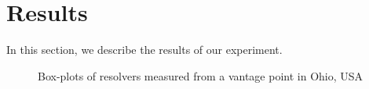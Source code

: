 \section{Results}\label{sec:results}
In this section, we describe the results of our experiment. 

\begin{figure}[t!]
    \centering
    \hfill
    \hfill
    \caption{Box-plots of resolvers measured from a vantage point in Ohio, USA}
    \label{fig:dns_timings}
\end{figure}

